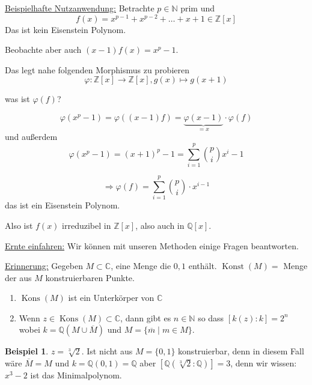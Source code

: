 \documentclass[12pt,parskip=full]{scrartcl}
\newcommand{\setN}{\mathbb{N}}
\newcommand{\setZ}{\mathbb{Z}}
\newcommand{\setQ}{\mathbb{Q}}
\newcommand{\setC}{\mathbb{C}}
\newcommand{\heading}{\underline}
\theoremstyle{definition}
\newtheorem{example}[theorem]{Beispiel}
\theoremstyle{remark}
\begin{document}
	\heading{Beispielhafte Nutzanwendung:} Betrachte $p \in \setN$ prim und
	\begin{equation*}
		f(x) = x^{p-1} + x^{p-2} + \dots + x + 1 \in \setZ[x]
	\end{equation*}
	Das ist kein Eisenstein Polynom.
	
	Beobachte aber auch $(x-1)f(x) = x^p -1$.
	
	Das legt nahe folgenden Morphismus zu probieren
	\begin{equation*}
		\varphi: \setZ[x] \to \setZ[x], g(x) \mapsto g(x + 1)
	\end{equation*}
	
	was ist $\varphi(f)$?
	
	\begin{equation*}
		\varphi(x^p - 1) = \varphi((x-1)f) = \underbrace{\varphi(x-1)}_{=x} \cdot \varphi(f)
	\end{equation*}
	und außerdem
	\begin{equation*}
		\varphi(x^p - 1) = (x+1)^p - 1 = \sum_{i=1}^{p} \binom{p}{i} x^i - 1
	\end{equation*}
	
	\begin{equation*}
		\Rightarrow \varphi(f) = \sum_{i = 1}^p \binom{p}{i} \cdot x^{i-1}
	\end{equation*}
	das ist ein Eisenstein Polynom.
	
	Also ist $f(x)$ irreduzibel in $\setZ[x]$, also auch in $\setQ[x]$.
	
	\heading{Ernte einfahren:} Wir können mit unseren Methoden einige Fragen beantworten.
	
	\heading{Erinnerung:} Gegeben $M \subset \setC$, eine Menge die $0,1$ enthält. $\operatorname{Konst}(M) =$ Menge der aus $M$ konstruierbaren Punkte.
	
	\begin{enumerate}
		\item $\operatorname{Kons}(M)$ ist ein Unterkörper von $\setC$
		\item Wenn $z \in \operatorname{Kons}(M) \subset \setC$, dann gibt es $n \in \setN$ so dass $[k(z): k] = 2^n$ wobei $k = \setQ(M \cup \overline{M})$ und $M = \{ \overline{m} \mid m \in M \}$.
	\end{enumerate}
	
	\begin{example}
		$z = \sqrt[3]{2}$. Ist nicht aus $M = \{ 0, 1 \}$ konstruierbar, denn in diesem Fall wäre $\overline{M} = M$ und $k = \setQ(0,1) = \setQ$ aber $[\setQ(\sqrt[3]{2}: \setQ)] = 3$, denn wir wissen: $x^3 - 2$ ist das Minimalpolynom.
	\end{example}
\end{document}
